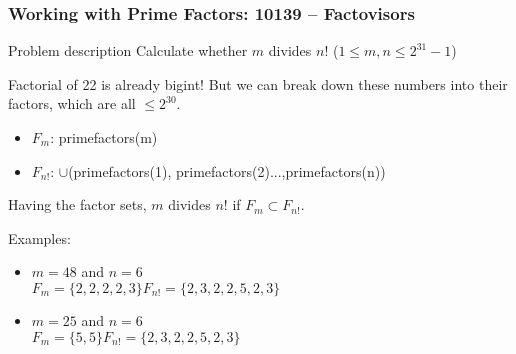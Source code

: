 \documentclass{beamer}
\begin{document}
\begin{frame}
  \frametitle{Working with Prime Factors: 10139 -- Factovisors}

  {\smaller
    \begin{block}{Problem description}
      Calculate whether $m$ divides $n!$ ($1 \leq m,n \leq 2^{31}-1$)
    \end{block}

    Factorial of 22 is already bigint! But we can break down these numbers into their
    factors, which are all $\leq 2^{30}$.

    \begin{itemize}
    \item $F_m$: primefactors(m)
    \item $F_{n!}$: $\cup$(primefactors(1), primefactors(2)...,primefactors(n))
    \end{itemize}

    Having the factor sets, $m$ divides $n!$ if $F_m \subset F_{n!}$.

    \bigskip

    Examples:
    \begin{itemize}
    \item $m = 48$ and $n=6$\\
      $F_m = \{2,2,2,2,3\} F_{n!} = \{2,3,2,2,5,2,3\}$

  \medskip

    \item $m = 25$ and $n = 6$\\
      $F_m = \{5,5\} F_{n!} = \{2,3,2,2,5,2,3\}$

    \end{itemize}
  }
\end{frame}


\end{document}
